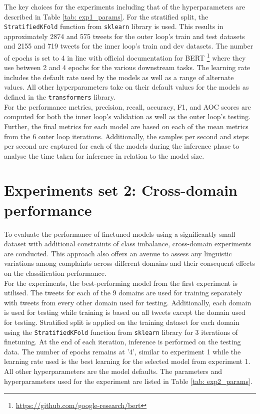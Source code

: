The key choices for the experiments including that of the hyperparameters are described in Table \ref{tab: exp1_params}. For the stratified split, the \texttt{StratifiedKFold} function from \texttt{sklearn} library is used. This results in approximately 2874 and 575 tweets for the outer loop's train and test datasets and 2155 and 719 tweets for the inner loop's train and dev datasets. The number of epochs is set to 4 in line with official documentation for BERT \footnote{\url{https://github.com/google-research/bert}} where they use between 2 and 4 epochs for the various downstream tasks. The learning rate includes the default rate used by the models as well as a range of alternate values. All other hyperparameters take on their default values for the models as defined in the \texttt{transformers} library.\\

For the performance metrics, precision, recall, accuracy, F1, and AOC scores are computed for both the inner loop's validation as well as the outer loop's testing. Further, the final metrics for each model are based on each of the mean metrics from the 6 outer loop iterations. Additionally, the samples per second and steps per second are captured for each of the models during the inference phase to analyse the time taken for inference in relation to the model size.

\section{Experiments set 2: Cross-domain performance}
To evaluate the performance of finetuned models using a significantly small dataset with additional constraints of class imbalance, cross-domain experiments are conducted. This approach also offers an avenue to assess any linguistic variations among complaints across different domains and their consequent effects on the classification performance. \\

For the experiments, the best-performing model from the first experiment is utilised. The tweets for each of the 9 domains are used for training separately with tweets from every other domain used for testing. Additionally, each domain is used for testing while training is based on all tweets except the domain used for testing. Stratified split is applied on the training dataset for each domain using the \texttt{StratifiedKFold} function from \texttt{sklearn} library for 3 iterations of finetuning. At the end of each iteration, inference is performed on the testing data.  The number of epochs remains at '4', similar to experiment 1 while the learning rate used is the best learning for the selected model from experiment 1. All other hyperparameters are the model defaults. The parameters and hyperparameters used for the experiment are listed in Table \ref{tab: exp2_params}.\\

